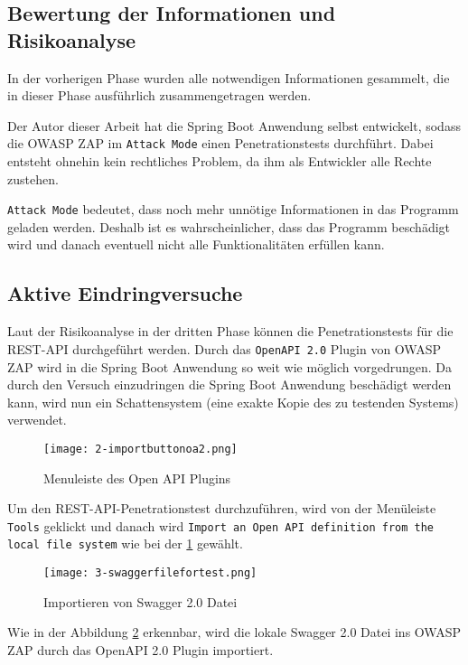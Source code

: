 \subsection{Bewertung der Informationen und Risikoanalyse}

In der vorherigen Phase wurden alle notwendigen Informationen gesammelt, die in dieser Phase ausführlich zusammengetragen werden. 

Der Autor dieser Arbeit hat die Spring Boot Anwendung selbst entwickelt, sodass die OWASP ZAP im \texttt{Attack Mode} einen  Penetrationstests durchführt. Dabei entsteht ohnehin kein rechtliches Problem, da ihm als Entwickler alle Rechte zustehen.

\texttt{Attack Mode} bedeutet, dass noch mehr unnötige Informationen in das Programm geladen werden. Deshalb ist es wahrscheinlicher, dass das Programm beschädigt wird und danach eventuell nicht alle Funktionalitäten erfüllen kann.

\subsection{Aktive Eindringversuche}

Laut der Risikoanalyse in der dritten Phase können die Penetrationstests für die REST-API durchgeführt werden. Durch das \texttt{OpenAPI 2.0} Plugin von OWASP ZAP wird in die Spring Boot Anwendung so weit wie möglich vorgedrungen. Da durch den Versuch einzudringen die Spring Boot Anwendung beschädigt werden kann, wird nun ein Schattensystem (eine exakte Kopie des zu testenden Systems) verwendet.\\

\newpage

\begin{figure}[h]
	\centering
	\texttt{[image: 2-importbuttonoa2.png]}
	\caption{Menuleiste des Open API Plugins}
	\label{swaggerimport1}
\end{figure}

Um den REST-API-Penetrationstest durchzuführen, wird von der Menüleiste \texttt{Tools} geklickt und danach wird \texttt{Import an Open API definition from the local file system} wie bei der \ref{swaggerimport1} gewählt.

\begin{figure}[h]
	\centering
	\texttt{[image: 3-swaggerfilefortest.png]}
	\caption{Importieren von Swagger 2.0 Datei}
	\label{swaggerimport2}
\end{figure}


Wie in der Abbildung \ref{swaggerimport2} erkennbar, wird die lokale Swagger 2.0 Datei ins OWASP ZAP durch das OpenAPI 2.0 Plugin importiert.

